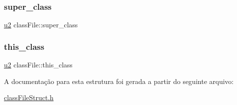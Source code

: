 \subsubsection{\texorpdfstring{super\+\_\+class}{super\_class}}
{\footnotesize\ttfamily \hyperlink{lista__operandos_8h_a732cde1300aafb73b0ea6c2558a7a54f}{u2} class\+File\+::super\+\_\+class}

\mbox{\label{structclassFile_a152ce2f57b3fa175b95069452f9fa063}} 
\subsubsection{\texorpdfstring{this\+\_\+class}{this\_class}}
{\footnotesize\ttfamily \hyperlink{lista__operandos_8h_a732cde1300aafb73b0ea6c2558a7a54f}{u2} class\+File\+::this\+\_\+class}



A documentação para esta estrutura foi gerada a partir do seguinte arquivo\+:\begin{DoxyCompactItemize}
\item 
\hyperlink{classFileStruct_8h}{class\+File\+Struct.\+h}\end{DoxyCompactItemize}
